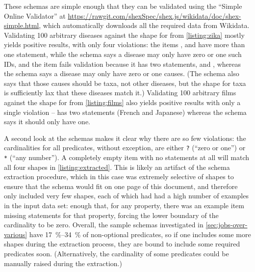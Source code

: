 These \glspl{schema} are simple enough that they can be validated using the “Simple Online Validator”
at \url{https://rawgit.com/shexSpec/shex.js/wikidata/doc/shex-simple.html},
which automatically downloads all the required data from \gls{Wikidata}.
Validating 100 arbitrary diseases
against the \gls{shape} for  from \cref{listing:zika} mostly yields positive results,
with only four violations:
the \glspl{item} ,
 and 
have more than one  \gls{statement}, while the \gls{schema} says a disease may only have zero or one such IDs,
and the \gls{item}  fails validation because it has two  \glspl{statement},
 and ,
whereas the \gls{schema} says a disease may only have zero or one causes.
(The \gls{schema} also says that those causes should be taxa, not other diseases,
but the \gls{shape} for taxa is sufficiently lax that these diseases match it.)
Validating 100 arbitrary films
against the \gls{shape} for  from \cref{listing:films} also yields positive results with only a single violation –
 has two  \glspl{statement} (French and Japanese)
whereas the \gls{schema} says it should only have one.

A second look at the \glspl{schema} makes it clear why there are so few violations:
the cardinalities for all \glspl{predicate}, without exception,
are either \lstinline{?} (“zero or one”) or \lstinline{*} (“any number”).
A completely empty \gls{item} with no \glspl{statement} at all
will match all four \glspl{shape} in \cref{listing:extracted}.
This is likely an artifact of the \gls{schema} extraction procedure,
which in this case was extremely selective of \glspl{shape}
to ensure that the \gls{schema} would fit on one page of this document,
and therefore only included very few \glspl{shape},
each of which had had a high number of examples in the input data set:
enough that, for any \gls{property},
there was an example \gls{item} missing \glspl{statement} for that \gls{property},
forcing the lower boundary of the cardinality to be zero.
Overall, the sample \glspl{schema} investigated in \cref{sec:jobs-over-various}
have \SIrange{17}{34}{\percent} of non-optional \glspl{predicate},
so if one includes some more \glspl{shape} during the extraction process,
they are bound to include some required \glspl{predicate} soon.
(Alternatively, the cardinality of some \glspl{predicate} could be manually raised during the extraction.)

